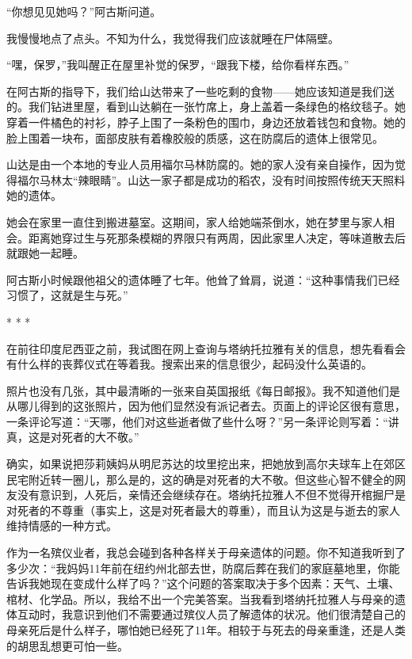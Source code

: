 \documentclass[12pt,oneside]{book}
\begin{document}
\begin{bookref}[frametitle={\cite{好好告别}}]
“你想见见她吗？”阿古斯问道。

我慢慢地点了点头。不知为什么，我觉得我们应该就睡在尸体隔壁。

“嘿，保罗，”我叫醒正在屋里补觉的保罗，“跟我下楼，给你看样东西。”

在阿古斯的指导下，我们给山达带来了一些吃剩的食物——她应该知道是我们送的。我们钻进里屋，看到山达躺在一张竹席上，身上盖着一条绿色的格纹毯子。她穿着一件橘色的衬衫，脖子上围了一条粉色的围巾，身边还放着钱包和食物。她的脸上围着一块布，面部皮肤有着橡胶般的质感，这在防腐后的遗体上很常见。

山达是由一个本地的专业人员用福尔马林防腐的。她的家人没有亲自操作，因为觉得福尔马林太“辣眼睛”。山达一家子都是成功的稻农，没有时间按照传统天天照料她的遗体。

她会在家里一直住到搬进墓室。这期间，家人给她端茶倒水，她在梦里与家人相会。距离她穿过生与死那条模糊的界限只有两周，因此家里人决定，等味道散去后就跟她一起睡。

阿古斯小时候跟他祖父的遗体睡了七年。他耸了耸肩，说道：“这种事情我们已经习惯了，这就是生与死。”

\begin{center}
* * *
\end{center}

在前往印度尼西亚之前，我试图在网上查询与塔纳托拉雅有关的信息，想先看看会有什么样的丧葬仪式在等着我。搜索出来的信息很少，起码没什么英语的。

照片也没有几张，其中最清晰的一张来自英国报纸《每日邮报》。我不知道他们是从哪儿得到的这张照片，因为他们显然没有派记者去。页面上的评论区很有意思，一条评论写道：“天哪，他们对这些逝者做了些什么呀？”另一条评论则写着：“讲真，这是对死者的大不敬。”

确实，如果说把莎莉姨妈从明尼苏达的坟里挖出来，把她放到高尔夫球车上在郊区民宅附近转一圈儿，那么是的，这的确是对死者的大不敬。但这些心智不健全的网友没有意识到，人死后，亲情还会继续存在。塔纳托拉雅人不但不觉得开棺掘尸是对死者的不尊重（事实上，这是对死者最大的尊重），而且认为这是与逝去的家人维持情感的一种方式。

作为一名殡仪业者，我总会碰到各种各样关于母亲遗体的问题。你不知道我听到了多少次：“我妈妈11年前在纽约州北部去世，防腐后葬在我们的家庭墓地里，你能告诉我她现在变成什么样了吗？”这个问题的答案取决于多个因素：天气、土壤、棺材、化学品。所以，我给不出一个完美答案。当我看到塔纳托拉雅人与母亲的遗体互动时，我意识到他们不需要通过殡仪人员了解遗体的状况。他们很清楚自己的母亲死后是什么样子，哪怕她已经死了11年。相较于与死去的母亲重逢，还是人类的胡思乱想更可怕一些。


\end{bookref}
\end{document}

